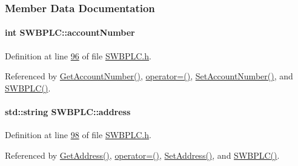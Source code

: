 \subsubsection{Member Data Documentation}
\paragraph[{\texorpdfstring{account\+Number}{accountNumber}}]{\setlength{\rightskip}{0pt plus 5cm}int S\+W\+B\+P\+L\+C\+::account\+Number\hspace{0.3cm}{\ttfamily [private]}}\hypertarget{class_s_w_b_p_l_c_a5d03f989254b88bdb7eb3deeec7e4217_a5d03f989254b88bdb7eb3deeec7e4217}{}\label{class_s_w_b_p_l_c_a5d03f989254b88bdb7eb3deeec7e4217_a5d03f989254b88bdb7eb3deeec7e4217}


Definition at line \hyperlink{_s_w_b_p_l_c_8h_source_l00096}{96} of file \hyperlink{_s_w_b_p_l_c_8h_source}{S\+W\+B\+P\+L\+C.\+h}.



Referenced by \hyperlink{_s_w_b_p_l_c_8cpp_source_l00080}{Get\+Account\+Number()}, \hyperlink{_s_w_b_p_l_c_8h_source_l00063}{operator=()}, \hyperlink{_s_w_b_p_l_c_8cpp_source_l00076}{Set\+Account\+Number()}, and \hyperlink{_s_w_b_p_l_c_8h_source_l00024}{S\+W\+B\+P\+L\+C()}.

\paragraph[{\texorpdfstring{address}{address}}]{\setlength{\rightskip}{0pt plus 5cm}std\+::string S\+W\+B\+P\+L\+C\+::address\hspace{0.3cm}{\ttfamily [private]}}\hypertarget{class_s_w_b_p_l_c_a86edad3cbbc5903c8ab8a45b22c0dd15_a86edad3cbbc5903c8ab8a45b22c0dd15}{}\label{class_s_w_b_p_l_c_a86edad3cbbc5903c8ab8a45b22c0dd15_a86edad3cbbc5903c8ab8a45b22c0dd15}


Definition at line \hyperlink{_s_w_b_p_l_c_8h_source_l00098}{98} of file \hyperlink{_s_w_b_p_l_c_8h_source}{S\+W\+B\+P\+L\+C.\+h}.



Referenced by \hyperlink{_s_w_b_p_l_c_8cpp_source_l00064}{Get\+Address()}, \hyperlink{_s_w_b_p_l_c_8h_source_l00063}{operator=()}, \hyperlink{_s_w_b_p_l_c_8cpp_source_l00060}{Set\+Address()}, and \hyperlink{_s_w_b_p_l_c_8h_source_l00024}{S\+W\+B\+P\+L\+C()}.

